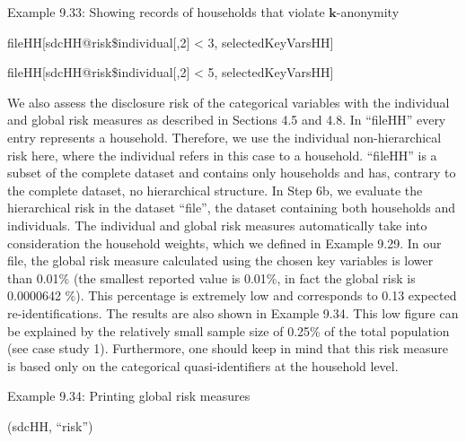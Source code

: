 \documentclass[letterpaper,10pt,english]{sphinxmanual}
\begin{document}
Example 9.33: Showing records of households that violate
\(\mathbf{k}\)-anonymity

\begin{DUlineblock}{0em}
\item[] 
\item[] fileHH{[}sdcHH@risk\$individual{[},2{]} \textless{} 3, selectedKeyVarsHH{]} 
\end{DUlineblock}

fileHH{[}sdcHH@risk\$individual{[},2{]} \textless{} 5, selectedKeyVarsHH{]} 

We also assess the disclosure risk of the categorical variables with the
individual and global risk measures as described in Sections 4.5 and
4.8. In “fileHH” every entry represents a household. Therefore, we use
the individual non-hierarchical risk here, where the individual refers
in this case to a household. “fileHH” is a subset of the complete
dataset and contains only households and has, contrary to the complete
dataset, no hierarchical structure. In Step 6b, we evaluate the
hierarchical risk in the dataset “file”, the dataset containing both
households and individuals. The individual and global risk measures
automatically take into consideration the household weights, which we
defined in Example 9.29. In our file, the global risk measure calculated
using the chosen key variables is lower than 0.01\% (the smallest
reported value is 0.01\%, in fact the global risk is 0.0000642 \%). This
percentage is extremely low and corresponds to 0.13 expected
re-identifications. The results are also shown in Example 9.34. This low
figure can be explained by the relatively small sample size of 0.25\% of
the total population (see case study 1). Furthermore, one should keep in
mind that this risk measure is based only on the categorical
quasi-identifiers at the household level.

Example 9.34: Printing global risk measures

(sdcHH, “risk”)

\begin{DUlineblock}{0em}
\item[] 
\item[] \sphinxcode{\sphinxupquote{\#\#}}
\item[] 
\item[] \sphinxcode{\sphinxupquote{\%)}}
\end{DUlineblock}
\end{document}
